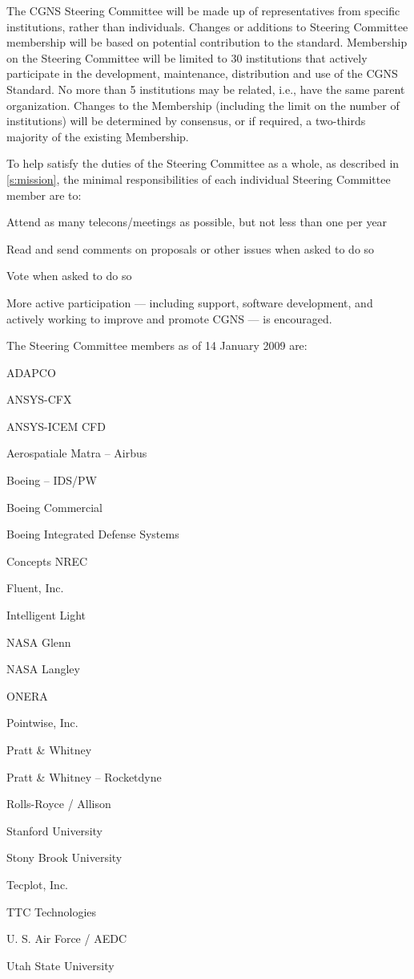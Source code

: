 The CGNS Steering Committee will be made up of representatives from
specific institutions, rather than individuals.
Changes or additions to Steering Committee membership will be based on
potential contribution to the standard.
Membership on the Steering Committee will be limited to 30 institutions
that actively participate in the development, maintenance, distribution
and use of the CGNS Standard.
No more than 5 institutions may be related, i.e., have the same parent
organization.
Changes to the Membership (including the limit on the number of
institutions) will be determined by consensus, or if required, a
two-thirds majority of the existing Membership.

To help satisfy the duties of the Steering Committee as a whole, as
described in \autoref{s:mission}, the minimal responsibilities of each
individual Steering Committee member are to:
\begin{itemize*}
\item Attend as many telecons/meetings as possible, but not less than
      one per year
\item Read and send comments on proposals or other issues when asked to
      do so
\item Vote when asked to do so
\end{itemize*}
More active participation --- including support, software development,
and actively working to improve and promote CGNS --- is encouraged.

\newpage
The Steering Committee members as of 14 January 2009 are:

\begin{itemize*}
\item ADAPCO
\item ANSYS-CFX
\item ANSYS-ICEM CFD
\item Aerospatiale Matra -- Airbus
\item Boeing -- IDS/PW
\item Boeing Commercial
\item Boeing Integrated Defense Systems
\item Concepts NREC
\item Fluent, Inc.
\item Intelligent Light
\item NASA Glenn
\item NASA Langley
\item ONERA
\item Pointwise, Inc.
\item Pratt \& Whitney
\item Pratt \& Whitney -- Rocketdyne
\item Rolls-Royce / Allison
\item Stanford University
\item Stony Brook University
\item Tecplot, Inc.
\item TTC Technologies
\item U. S. Air Force / AEDC
\item Utah State University
\end{itemize*}

